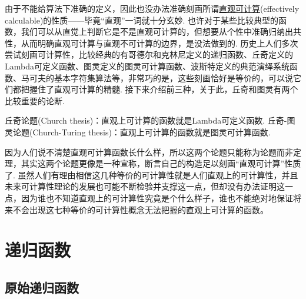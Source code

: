 由于不能给算法下准确的定义，因此也没办法准确刻画所谓\underline{直观可计算}(effectively calculable)的性质——毕竟“直观”一词就十分玄妙. 也许对于某些比较典型的函数，我们可以从直觉上判断它是不是直观可计算的，但想要从个性中准确归纳出共性，从而明确直观可计算与直观不可计算的边界，是没法做到的. 历史上人们多次尝试刻画可计算性，比较经典的有哥德尔和克林尼定义的递归函数、丘奇定义的Lambda可定义函数、图灵定义的图灵可计算函数、波斯特定义的典范演绎系统函数、马可夫的基本字符集算法等，非常巧的是，这些刻画恰好是等价的，可以说它们都把握住了直观可计算的精髓. 接下来介绍前三种，关于此，丘奇和图灵有两个比较重要的论断.

\begin{reference}
    丘奇论题(Church thesis)：直观上可计算的函数就是Lambda可定义函数.\newline
    丘奇-图灵论题(Church-Turing thesis)：直观上可计算的函数就是图灵可计算函数.
\end{reference}

因为人们说不清楚直观可计算函数长什么样，所以这两个论题只能称为论题而非定理，其实这两个论题更像是一种宣称，断言自己的构造足以刻画“直观可计算”性质了. 虽然人们有理由相信这几种等价的可计算性就是人们直观上的可计算性，并且未来可计算性理论的发展也可能不断检验并支撑这一点，但却没有办法证明这一点，因为谁也不知道直观上的可计算性究竟是个什么样子，谁也不能绝对地保证将来不会出现这七种等价的可计算性概念无法把握的直观上可计算的函数。

\section{递归函数}

\subsection{原始递归函数}

